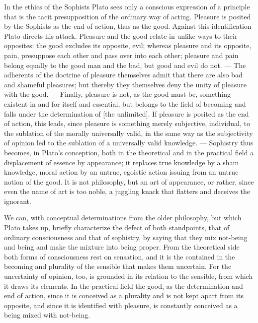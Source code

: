 In the ethics of the Sophists Plato sees only a conscious expression
of a principle that is the tacit
presupposition of the ordinary way of acting. Pleasure is posited by the Sophists as the
end of action, thus as the good. Against this identification
Plato directs his attack. Pleasure and the good relate in unlike
ways to their opposites: the good excludes its opposite, evil; whereas pleasure and its opposite,
pain, presuppose each other and pass over into each other; pleasure
and pain belong equally to the good man and the bad, but good
and evil do not. --- The adherents of the doctrine of pleasure themselves admit
that there are also bad and shameful pleasures; but thereby they themselves deny the unity of pleasure with the good. --- Finally,
pleasure is not, as the good must be, something existent in and for itself and
essential, but belongs to the field of becoming and falls
under the determination of  [the unlimited]. If pleasure is posited as the
end of action, this leads, since pleasure is something merely subjective, individual, to the sublation of the morally universally valid, in the same way as the subjectivity of opinion led
to the sublation of a universally valid knowledge. --- Sophistry thus
becomes, in Plato's conception, both in the theoretical and
in the practical field a displacement of essence by appearance;
it replaces true knowledge by a sham knowledge, moral action by an untrue, egoistic action issuing from an untrue notion of the good. It is not philosophy, but an art of appearance, or rather, since even the name of
art is too noble, a juggling knack that flatters and
deceives the ignorant.

We can, with conceptual determinations from the older philosophy, but which Plato takes up, briefly characterize the defect of both standpoints, that of ordinary consciousness and that of sophistry,
by saying that they mix not-being and being and make the mixture into being proper. From the theoretical side
both forms of consciousness rest on sensation, and it is the 
contained in the becoming and plurality of the sensible that makes them
uncertain. For the uncertainty of opinion, too, is grounded
in its relation to the sensible, from which it draws its elements. In the practical field the good, as the determination and end of action, since it is conceived as a plurality
and is not kept apart from its opposite, and since it is identified with pleasure, is constantly conceived as a being mixed with not-being.

